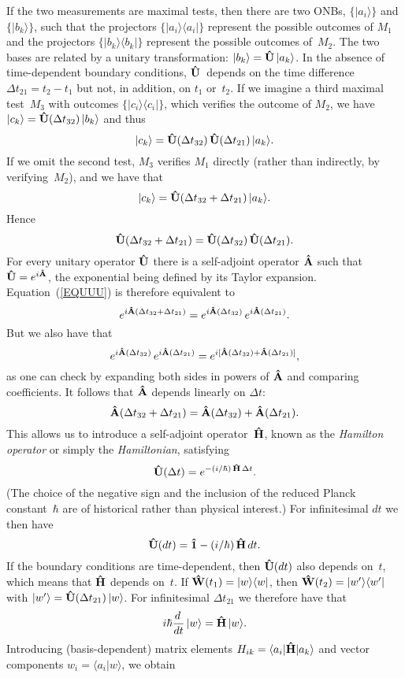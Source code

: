 \documentclass[12pt]{article}
\newcommand{\ket}[1]{\vert#1\rangle}
\newcommand{\braket}[2]{\langle#1\vert#2\rangle}
\newcommand{\ketbra}[2]{\vert#1\rangle\langle#2\vert}
\newcommand{\sandwich}[3]{\langle#1\vert#2\vert#3\rangle}
\newcommand{\be}{\begin{equation}}
\newcommand{\ee}{\end{equation}}
\newcommand{\hA}{{\bf\hat A}}
\newcommand{\hI}{{\bf\hat 1}}
\newcommand{\hH}{{\bf\hat H}}
\newcommand{\hU}{{\bf\hat U}}
\newcommand{\hW}{{\bf\hat W}}
\begin{document}
If the two measurements are maximal tests, then there are two ONBs, $\{\ket{a_i}\}$ and $\{\ket{b_k}\}$, such that the projectors $\{\ketbra{a_i}{a_i}\}$ represent the possible outcomes of $M_1$ and the projectors $\{\ketbra{b_k}{b_k}\}$ represent the possible outcomes of~$M_2$. The two bases are related by a unitary transformation: $\ket{b_k}=\hU\,\ket{a_k}$. In the absence of time-dependent boundary conditions, $\hU$~depends on the time difference $\Delta t_{21}=t_2-t_1$ but not, in addition, on $t_1$ or~$t_2$. If we imagine a third maximal test~$M_3$ with outcomes $\{\ketbra{c_i}{c_i}\}$, which verifies the outcome of $M_2$, we have $\ket{c_k}=\hU(\Delta t_{32})\,\ket{b_k}$ and thus
\be
\ket{c_k}=\hU(\Delta t_{32})\,\hU(\Delta t_{21})\,\ket{a_k}.
\ee
If we omit the second test, $M_3$ verifies $M_1$ directly (rather than indirectly, by verifying~$M_2$), and we have that
\be
\ket{c_k}=\hU(\Delta t_{32}+\Delta t_{21})\,\ket{a_k}.
\ee
Hence
\be
\hU(\Delta t_{32}+\Delta t_{21})=\hU(\Delta t_{32})\,\hU(\Delta t_{21}).
\label{EQUUU}
\ee
For every unitary operator $\hU$ there is a self-adjoint operator $\hA$ such that $\hU=e^{i\hA}$, the exponential being defined by its Taylor expansion.
Equation~(\ref{EQUUU}) is therefore equivalent to
\be
e^{i\hA(\Delta t_{32}+\Delta t_{21})}=e^{i\hA(\Delta t_{32})}\,e^{i\hA(\Delta t_{21})}.
\ee
But we also have that
\be
e^{i\hA(\Delta t_{32})}\,e^{i\hA(\Delta t_{21})}=e^{i[\hA(\Delta t_{32})+\hA(\Delta t_{21})]},
\ee
as one can check by expanding both sides in powers of $\hA$ and comparing coefficients. It follows that $\hA$ depends linearly on $\Delta t$:
\be
\hA(\Delta t_{32}+\Delta t_{21})=\hA(\Delta t_{32})+\hA(\Delta t_{21}).
\ee
This allows us to introduce a self-adjoint operator~$\hH$, known as the \textit{Hamilton operator} or simply the {\it Hamiltonian\/}, satisfying
\be
\hU(\Delta t)=e^{-(i/\hbar)\,\hH\,\Delta t}.
\ee
(The choice of the negative sign and the inclusion of the reduced Planck constant~$\hbar$ are of historical rather than physical interest.) For infinitesimal $dt$ we then have
\be
\hU(dt)=\hI-(i/\hbar)\,\hH\,dt.
\label{EQhUdt}
\ee
If the boundary conditions are time-dependent, then $\hU(dt)$ also depends on~$t$, which means that $\hH$ depends on~$t$. If $\hW(t_1)=\ketbra ww$, then $\hW(t_2)=\ketbra{w'}{w'}$ with $\ket{w'}=\hU(\Delta t_{21})\,\ket{w}$. For infinitesimal $\Delta t_{21}$ we therefore have that
\be
i\hbar\frac{d\,}{dt}\,\ket w=\hH\,\ket{w}.
\label{EQtevol}
\ee
Introducing (basis-dependent) matrix elements $H_{ik}=\sandwich{a_i}{\hH}{a_k}$ and vector components $w_i=\braket{a_i}{w}$, we obtain
\end{document}
